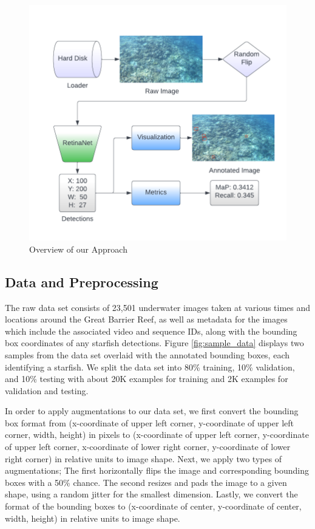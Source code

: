 \documentclass{article}
\begin{document}
\begin{figure}
    \centering
    \includegraphics[width=\textwidth]{overview.png}
    \caption{Overview of our Approach}
    \label{fig:approach_overview}
\end{figure}

\subsection{Data and Preprocessing}
The raw data set consists of 23,501 underwater images taken at various times and locations around the Great Barrier Reef, as well as metadata for the images which include the associated video and sequence IDs, along with the bounding box coordinates of any starfish detections. Figure \ref{fig:sample_data} displays two samples from the data set overlaid with the annotated bounding boxes, each identifying a starfish.
We split the data set into 80\% training, 10\% validation, and 10\% testing with about 20K examples for training and 2K examples for validation and testing.  

In order to apply augmentations to our data set, we first convert the bounding box format from (x-coordinate of upper left corner, y-coordinate of upper left corner, width, height) in pixels to (x-coordinate of upper left corner, y-coordinate of upper left corner, x-coordinate of lower right corner, y-coordinate of lower right corner) in relative units to image shape. Next, we apply two types of augmentations; The first horizontally flips the image and corresponding bounding boxes with a 50\% chance. The second resizes and pads the image to a given shape, using a random jitter for the smallest dimension. Lastly, we convert the format of the bounding boxes to (x-coordinate of center, y-coordinate of center, width, height) in relative units to image shape.
\end{document}
